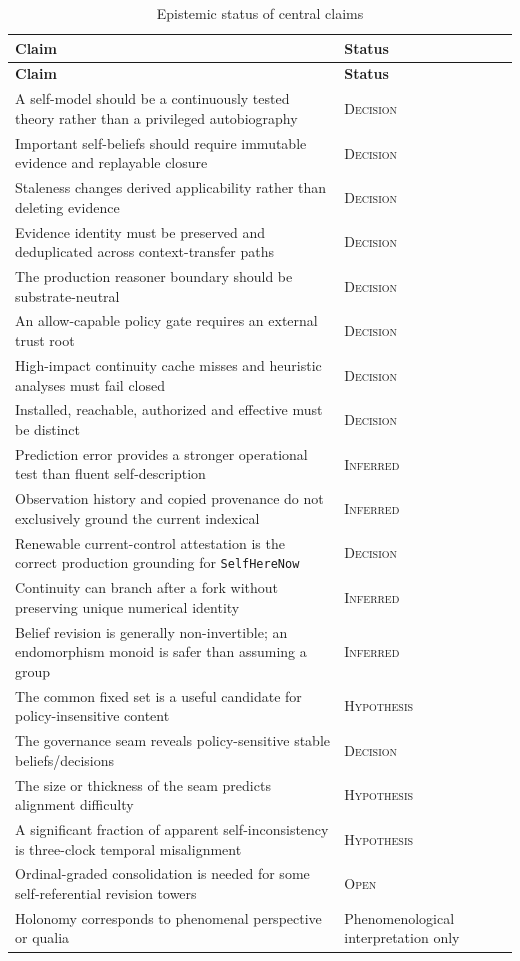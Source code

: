 \documentclass[11pt,oneside]{report}
\newcommand{\SelfHereNow}{\texttt{SelfHereNow}}
\newcommand{\statusdecision}{\textsc{Decision}}
\newcommand{\statusinferred}{\textsc{Inferred}}
\newcommand{\statushypothesis}{\textsc{Hypothesis}}
\newcommand{\statusopen}{\textsc{Open}}
\begin{document}
\begin{longtable}{@{}L{4.80in}L{1.70in}@{}}
\caption{Epistemic status of central claims}\label{tab:status}\\
\toprule
\textbf{Claim} & \textbf{Status} \\
\midrule
\endfirsthead
\toprule
\textbf{Claim} & \textbf{Status} \\
\midrule
\endhead
A self-model should be a continuously tested theory rather than a privileged autobiography & \statusdecision \\
Important self-beliefs should require immutable evidence and replayable closure & \statusdecision \\
Staleness changes derived applicability rather than deleting evidence & \statusdecision \\
Evidence identity must be preserved and deduplicated across context-transfer paths & \statusdecision \\
The production reasoner boundary should be substrate-neutral & \statusdecision \\
An allow-capable policy gate requires an external trust root & \statusdecision \\
High-impact continuity cache misses and heuristic analyses must fail closed & \statusdecision \\
Installed, reachable, authorized and effective must be distinct & \statusdecision \\
Prediction error provides a stronger operational test than fluent self-description & \statusinferred \\
Observation history and copied provenance do not exclusively ground the current indexical & \statusinferred \\
Renewable current-control attestation is the correct production grounding for \SelfHereNow{} & \statusdecision \\
Continuity can branch after a fork without preserving unique numerical identity & \statusinferred \\
Belief revision is generally non-invertible; an endomorphism monoid is safer than assuming a group & \statusinferred \\
The common fixed set is a useful candidate for policy-insensitive content & \statushypothesis \\
The governance seam reveals policy-sensitive stable beliefs/decisions & \statusdecision \\
The size or thickness of the seam predicts alignment difficulty & \statushypothesis \\
A significant fraction of apparent self-inconsistency is three-clock temporal misalignment & \statushypothesis \\
Ordinal-graded consolidation is needed for some self-referential revision towers & \statusopen \\
Holonomy corresponds to phenomenal perspective or qualia & Phenomenological interpretation only \\
\bottomrule
\end{longtable}
\end{document}
